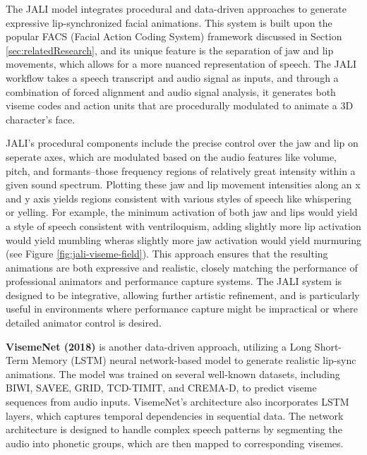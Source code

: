 \documentclass[12pt]{article}
\begin{document}
The JALI  model integrates procedural and data-driven approaches to generate expressive lip-synchronized facial animations. This system is built upon the popular FACS (Facial Action Coding System) framework \cite{F} discussed in Section \ref{sec:relatedResearch}, and its unique feature is the separation of jaw and lip movements, which allows for a more nuanced representation of speech. The JALI workflow takes a speech transcript and audio signal as inputs, and through a combination of forced alignment and audio signal analysis, it generates both viseme codes and action units that are procedurally modulated to animate a 3D character's face.

JALI’s procedural components include the precise control over the jaw and lip on seperate axes, which are modulated based on the audio features like volume, pitch, and formants--those frequency regions of relatively great intensity within a given sound spectrum. Plotting these jaw and lip movement intensities along an x and y axis yields regions consistent with various styles of speech like whispering or yelling. For example, the minimum activation of both jaw and lips would yield a style of speech consistent with ventriloquism, adding slightly more lip activation would yield mumbling wheras slightly more jaw activation would yield murmuring (see Figure \ref{fig:jali-viseme-field}). This approach ensures that the resulting animations are both expressive and realistic, closely matching the performance of professional animators and performance capture systems. The JALI system is designed to be integrative, allowing further artistic refinement, and is particularly useful in environments where performance capture might be impractical or where detailed animator control is desired.

\textbf{VisemeNet (2018)} \cite{Zhou2018visemenet} is another data-driven approach, utilizing a Long Short-Term Memory (LSTM) neural network-based model to generate realistic lip-sync animations. The model was trained on several well-known datasets, including BIWI, SAVEE, GRID, TCD-TIMIT, and CREMA-D, to predict viseme sequences from audio inputs. VisemeNet’s architecture also incorporates LSTM layers, which captures temporal dependencies in sequential data. The network architecture is designed to handle complex speech patterns by segmenting the audio into phonetic groups, which are then mapped to corresponding visemes. 
\end{document}
